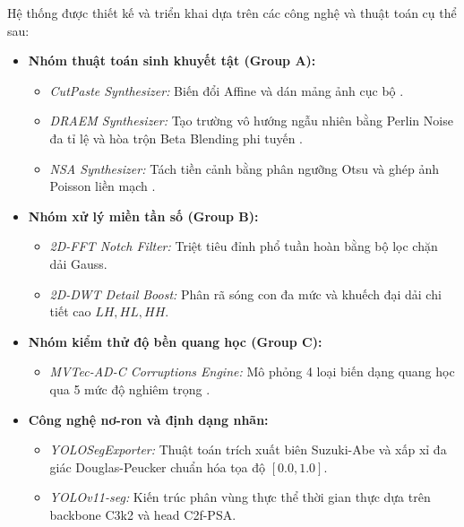Hệ thống được thiết kế và triển khai dựa trên các công nghệ và thuật toán cụ thể sau:
\begin{itemize}
    \item \textbf{Nhóm thuật toán sinh khuyết tật (Group A):}
    \begin{itemize}
        \item \textit{CutPaste Synthesizer:} Biến đổi Affine và dán mảng ảnh cục bộ \cite{li2021}.
        \item \textit{DRAEM Synthesizer:} Tạo trường vô hướng ngẫu nhiên bằng Perlin Noise đa tỉ lệ và hòa trộn Beta Blending phi tuyến \cite{zavrtanik2021}.
        \item \textit{NSA Synthesizer:} Tách tiền cảnh bằng phân ngưỡng Otsu và ghép ảnh Poisson liền mạch \cite{schluter2022}.
    \end{itemize}
    \item \textbf{Nhóm xử lý miền tần số (Group B):}
    \begin{itemize}
        \item \textit{2D-FFT Notch Filter:} Triệt tiêu đỉnh phổ tuần hoàn bằng bộ lọc chặn dải Gauss.
        \item \textit{2D-DWT Detail Boost:} Phân rã sóng con đa mức và khuếch đại dải chi tiết cao $LH, HL, HH$.
    \end{itemize}
    \item \textbf{Nhóm kiểm thử độ bền quang học (Group C):}
    \begin{itemize}
        \item \textit{MVTec-AD-C Corruptions Engine:} Mô phỏng 4 loại biến dạng quang học qua 5 mức độ nghiêm trọng \cite{horwitz2022}.
    \end{itemize}
    \item \textbf{Công nghệ nơ-ron và định dạng nhãn:}
    \begin{itemize}
        \item \textit{YOLOSegExporter:} Thuật toán trích xuất biên Suzuki-Abe \cite{suzuki1985} và xấp xỉ đa giác Douglas-Peucker chuẩn hóa tọa độ $[0.0, 1.0]$.
        \item \textit{YOLOv11-seg:} Kiến trúc phân vùng thực thể thời gian thực dựa trên backbone C3k2 và head C2f-PSA.
    \end{itemize}
\end{itemize}

